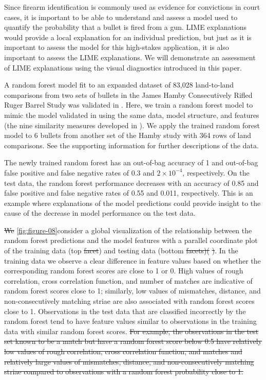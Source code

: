 \documentclass[AMS,STIX2COL]{WileyNJD-v2}\usepackage[]{graphicx}\usepackage[]{color}
\providecommand{\DIFadd}[1]{{\protect\color{blue}\uwave{#1}}} %
\providecommand{\DIFdel}[1]{{\protect\color{red}\sout{#1}}}                      %
\providecommand{\DIFaddbegin}{} %
\providecommand{\DIFaddend}{} %
\providecommand{\DIFdelbegin}{} %
\providecommand{\DIFdelend}{} %
\newcommand{\DIFscaledelfig}{0.5}
\newlength{\DIFdelgraphicswidth} %
\newlength{\DIFdelgraphicsheight} %
\newcommand{\DIFaddincludegraphics}[2][]{{\color{blue}\fbox{\DIFOincludegraphics[#1]{#2}}}} %
\newcommand{\DIFdelincludegraphics}[2][]{%
\sbox{\DIFdelgraphicsbox}{\DIFOincludegraphics[#1]{#2}}%
\settoboxwidth{\DIFdelgraphicswidth}{\DIFdelgraphicsbox} %
\settoboxtotalheight{\DIFdelgraphicsheight}{\DIFdelgraphicsbox} %
\scalebox{\DIFscaledelfig}{%
\parbox[b]{\DIFdelgraphicswidth}{\usebox{\DIFdelgraphicsbox}\\[-\baselineskip] \rule{\DIFdelgraphicswidth}{0em}}\llap{\resizebox{\DIFdelgraphicswidth}{\DIFdelgraphicsheight}{%
\setlength{\unitlength}{\DIFdelgraphicswidth}%
\begin{picture}(1,1)%
\thicklines\linethickness{2pt} %
{\color[rgb]{1,0,0}\put(0,0){\framebox(1,1){}}}%
{\color[rgb]{1,0,0}\put(0,0){\line( 1,1){1}}}%
{\color[rgb]{1,0,0}\put(0,1){\line(1,-1){1}}}%
\end{picture}%
}\hspace*{3pt}}} %
} %
\DeclareRobustCommand{\DIFaddbegin}{\DIFOaddbegin \let\includegraphics\DIFaddincludegraphics} %
\DeclareRobustCommand{\DIFaddend}{\DIFOaddend \let\includegraphics\DIFOincludegraphics} %
\DeclareRobustCommand{\DIFdelbegin}{\DIFOdelbegin \let\includegraphics\DIFdelincludegraphics} %
\DeclareRobustCommand{\DIFdelend}{\DIFOaddend \let\includegraphics\DIFOincludegraphics} %
\begin{document}
Since firearm identification is commonly used as evidence for convictions in court cases, it is important to be able to understand and assess a model used to quantify the probability that a bullet is fired from a gun. LIME explanations would provide a local explanation for an individual prediction, but just as it is important to assess the model for this high-stakes application, it is also important to assess the LIME explanations. We will demonstrate an assessment of LIME explanations using the visual diagnostics introduced in this paper.

A random forest model fit to an expanded dataset of 83,028 land-to-land comparisons from two sets of bullets in the James Hamby Consecutively Rifled Ruger Barrel Study \citep{hamby:2009} was validated in \citet{vanderplas:2020}. Here, we train a random forest model to mimic the model validated in \citet{vanderplas:2020} using the same data, model structure, and features (the nine similarity measures developed in \citet{hare:2017}). We apply the trained random forest model to 6 bullets from another set of the Hamby study with 364 rows of land comparisons. See the supporting information for further descriptions of the data.

The newly trained random forest has an out-of-bag accuracy of 1 and out-of-bag false positive and false negative rates of 0.3 and \ensuremath{2\times 10^{-4}}, respectively. On the test data, the random forest performance decreases with an accuracy of 0.85 and false positive and false negative rates of 0.55 and 0.011, respectively. This is an example where explanations of the model predictions could provide insight to the cause of the decrease in model performance on the test data.

\DIFdelbegin \DIFdel{We }\DIFdelend \DIFaddbegin \DIFadd{In }\autoref{fig:figure-08}\DIFadd{, we }\DIFaddend consider a global visualization of the relationship between the random forest predictions and the model features with a parallel coordinate plot of the training data (top \DIFdelbegin \DIFdel{facet}\DIFdelend \DIFaddbegin \DIFadd{row}\DIFaddend ) and testing data (bottom \DIFdelbegin \DIFdel{facets)(}%
\DIFdel{)}\DIFdelend \DIFaddbegin \DIFadd{row)}\DIFaddend . In the training data we observe a clear difference in feature values based on whether the corresponding random forest scores are close to 1 or 0. High values of rough correlation, cross correlation function, and number of matches are indicative of random forest scores close to 1; similarly, low values of mismatches, distance, and non-consecutively matching striae are also associated with random forest scores close to 1. Observations in the test data that are classified incorrectly by the random forest tend to have feature values similar to observations in the training data with similar random forest scores.
\DIFdelbegin \DIFdel{For example, the observations in the test set known to be a match but have a random forest score below 0.5 have relatively low values of rough correlation, cross correlation function, and matches and relatively large values of mismatches, distance, and non-consecutively matching striae compared to observations with a random forest probability close to 1.
}\DIFdelend
\end{document}

